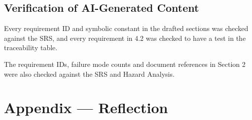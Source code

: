 \documentclass[12pt, titlepage]{article}
\begin{document}
\subsection{Verification of AI-Generated Content}

Every requirement ID and symbolic constant in the drafted sections was checked
against the SRS, and every requirement in 4.2 was checked to have a test in the
traceability table.

The requirement IDs, failure mode counts and document references in Section 2
were also checked against the SRS and Hazard Analysis.

\newpage{}

\section{Appendix --- Reflection}


\end{document}
